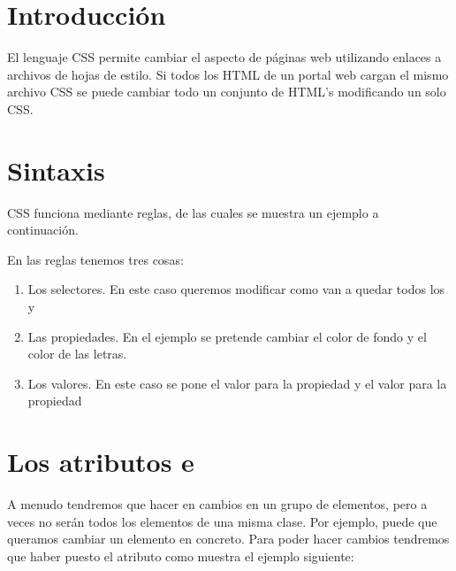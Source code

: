 \documentclass[letterpaper,10pt,spanish]{sphinxmanual}
\begin{document}
\section{Introducción}
\label{\detokenize{tema3:introduccion}}
El lenguaje CSS permite cambiar el aspecto de páginas web utilizando enlaces a archivos de hojas de estilo. Si todos los HTML de un portal web cargan el mismo archivo CSS se puede cambiar todo un conjunto de HTML’s modificando un solo CSS.


\section{Sintaxis}
\label{\detokenize{tema3:sintaxis}}
CSS funciona mediante reglas, de las cuales se muestra un ejemplo a continuación.

\begin{sphinxVerbatim}[commandchars=\\\{\}]
  
     
     
\end{sphinxVerbatim}

En las reglas tenemos tres cosas:
\begin{enumerate}
\item {} 
Los selectores. En este caso queremos modificar como van a quedar todos los  y 

\item {} 
Las propiedades. En el ejemplo se pretende cambiar el color de fondo y el color de las letras.

\item {} 
Los valores. En este caso se pone el valor  para la propiedad  y el valor  para la propiedad 

\end{enumerate}


\section{Los atributos  e }
\label{\detokenize{tema3:los-atributos-class-e-id}}
A menudo tendremos que hacer en cambios en un grupo de elementos, pero a veces no serán todos los elementos de una misma clase. Por ejemplo, puede que queramos cambiar un elemento en concreto. Para poder hacer cambios  tendremos que haber puesto el atributo  como muestra el ejemplo siguiente:
\end{document}
